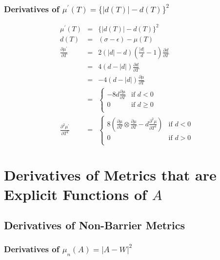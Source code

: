 \documentclass{report}
\begin{document}
\subsection{\label{franks} Derivatives of $\mu^\prime(T)=\{|d(T)| - d(T)\}^2$ }
\begin{eqnarray}
\mu^\prime(T) &=& \{|d(T)| - d(T)\}^2 \\
 d(T)        &=& (\sigma - \epsilon) - \mu(T) \\
 \frac{\partial \mu^\prime}{\partial T} 
    &=& 2 (|d| - d)\left(\frac{|d|}{d}-1\right)\frac{\partial d}{\partial T} \\
    &=& 4 (d - |d|)\frac{\partial d}{\partial T} \\
    &=& -4 (d - |d|)\frac{\partial \mu}{\partial T} \\
    &=& \left\{\begin{array}{ll}
         -8 d \frac{\partial \mu}{\partial T} & \textrm{if } d<0 \\
         0                                    & \textrm{if } d \ge 0 \\
         \end{array}\right. \\
 \frac{\partial^2 \mu^\prime}{\partial T^2} 
    &=& \left\{\begin{array}{ll}
         8 \left( \frac{\partial \mu}{\partial T} \otimes \frac{\partial \mu}{\partial T} 
             - d \frac{\partial^2 \mu}{\partial T^2} \right) & \textrm{if } d<0 \\
         0                                    & \textrm{if } d>0 \\
         \end{array}\right. 
\end{eqnarray}
         

\chapter{Derivatives of Metrics that are Explicit Functions of $A$}

\section{Derivatives of Non-Barrier Metrics}

\subsection{\label{diff} Derivatives of $\mu_n(A)=|A-W|^2$}
\end{document}
